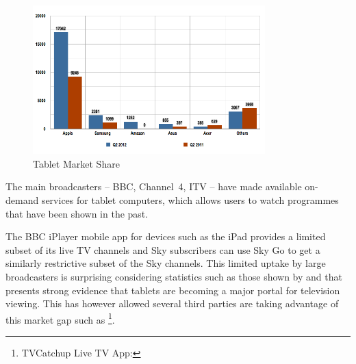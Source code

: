 	\begin{figure}[htb]
		\centering
			\includegraphics[width=0.8\textwidth]{images/idcTabletMarketShare.png}
		\caption{Tablet Market Share}
		\label{fig:tablet_market_share}
	\end{figure}

	The main broadcasters -- BBC, Channel~4, ITV -- have made available on-demand services for tablet computers, which allows users to watch programmes that have been shown in the past. %


	The BBC iPlayer mobile app for devices such as the iPad provides a limited subset of its live TV channels and Sky subscribers can use Sky Go to get a similarly restrictive subset of the Sky channels. This limited uptake by large broadcasters is surprising considering statistics such as those shown by \citet{viacom} and that \citep{socialTVPaper} presents strong evidence that tablets are becoming a major portal for television viewing. This has however allowed several third parties are taking advantage of this market gap such as \footnote{TVCatchup Live TV App: }.

